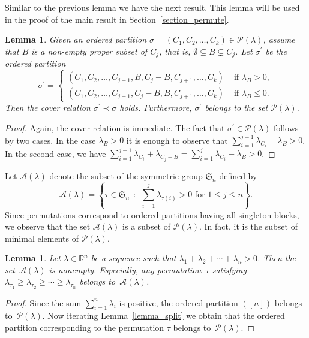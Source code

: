 \documentclass[10pt]{amsart}
\newtheorem{lemma}[theorem]{Lemma}
\theoremstyle{definition}
\newcommand{\Rrr}{\mathbb{R}}
\newcommand{\Sym}{\mathfrak{S}}
\newcommand{\coveredby}{\prec}
\newcommand{\lambdasumpositive}
{\lambda_{1} + \lambda_{2} + \cdots + \lambda_{n} > 0}
\begin{document}
Similar to the previous lemma we have the next result.
This lemma will be used in the proof of the main result
in Section~\ref{section_permute}.

\begin{lemma}
Given an ordered partition
$\sigma = (C_{1}, C_{2}, \ldots, C_{k}) \in \mathcal{P}(\lambda)$,
assume that $B$ is a non-empty proper subset of $C_{j}$,
that is,
$\emptyset \subsetneq B \subsetneq C_{j}$.
Let $\sigma^{\prime}$ be the ordered partition
$$
\sigma^{\prime}
=
\begin{cases}
(C_{1}, C_{2}, \ldots, C_{j-1}, B, C_{j} - B, C_{j+1}, \ldots, C_{k}) 
& \text{ if } \lambda_{B} > 0 , \\
(C_{1}, C_{2}, \ldots, C_{j-1}, C_{j} - B, B, C_{j+1}, \ldots, C_{k}) 
& \text{ if } \lambda_{B} \leq 0 . 
\end{cases}
$$
Then the cover relation $\sigma^{\prime} \coveredby \sigma$ holds.
Furthermore, $\sigma^{\prime}$ belongs to the set $\mathcal{P}(\lambda)$.
\label{lemma_split_block}
\end{lemma}
\begin{proof}
Again, the cover relation is immediate.
The fact that $\sigma^{\prime} \in \mathcal{P}(\lambda)$
follows by two cases.
In the case $\lambda_{B} > 0$
it is enough to observe that
$\sum_{i=1}^{j-1} \lambda_{C_{i}} + \lambda_{B} > 0$.
In the second case, we have
$\sum_{i=1}^{j-1} \lambda_{C_{i}} + \lambda_{C_{j} - B}
=
\sum_{i=1}^{j} \lambda_{C_{i}} - \lambda_{B}
 > 0$.
\end{proof}



Let $\mathcal{A}(\lambda)$ denote the subset
of the symmetric group $\Sym_{n}$
defined by
$$
\mathcal{A}(\lambda)
=
\left\{ \tau \in \Sym_{n} \:\: : \:\:
\sum_{i=1}^{j} \lambda_{\tau(i)} > 0 \text{ for } 1 \leq j\leq n \right\} .
$$
Since permutations correspond to ordered partitions
having all singleton blocks,
we observe that the set
$\mathcal{A}(\lambda)$ is a subset of
$\mathcal{P}(\lambda)$. In fact, it is the subset of minimal
elements of $\mathcal{P}(\lambda)$.


\begin{lemma}
Let $\lambda \in \Rrr^{n}$ be a sequence
such that $\lambdasumpositive$.
Then the set~$\mathcal{A}(\lambda)$ is nonempty.
Especially, any permutation~$\tau$
satisfying
$\lambda_{\tau_{1}} \geq \lambda_{\tau_{2}} \geq \cdots \geq \lambda_{\tau_{n}}$ 
belongs to~$\mathcal{A}(\lambda)$.
\end{lemma}
\begin{proof}
Since the sum $\sum_{i=1}^{n} \lambda_{i}$ is positive,
the ordered partition $([n])$ belongs 
to~$\mathcal{P}(\lambda)$.
Now iterating Lemma~\ref{lemma_split}
we obtain that the ordered partition corresponding to
the permutation $\tau$ 
belongs to~$\mathcal{P}(\lambda)$.
\end{proof}
\end{document}
